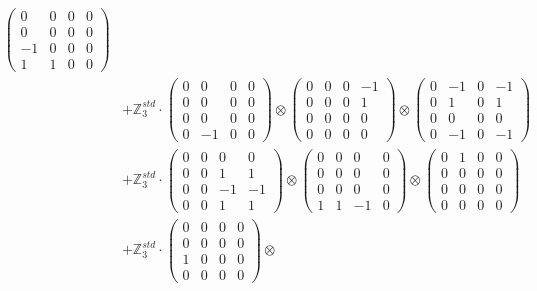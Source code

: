 \documentclass{article}
\begin{document}
{\begin{align}
            \begin{pmatrix} 0 & 0 & 0 & 0 \\ 0 & 0 & 0 & 0 \\ -1 & 0 & 0 & 0 \\ 1 & 1 & 0 & 0 \end{pmatrix} \\ 
        &+ \label{Rs16-Rc11-Solution-29-c25} \mathbb{Z}_3^{std} \cdot 
            \begin{pmatrix} 0 & 0 & 0 & 0 \\ 0 & 0 & 0 & 0 \\ 0 & 0 & 0 & 0 \\ 0 & -1 & 0 & 0 \end{pmatrix} \otimes 
            \begin{pmatrix} 0 & 0 & 0 & -1 \\ 0 & 0 & 0 & 1 \\ 0 & 0 & 0 & 0 \\ 0 & 0 & 0 & 0 \end{pmatrix} \otimes 
            \begin{pmatrix} 0 & -1 & 0 & -1 \\ 0 & 1 & 0 & 1 \\ 0 & 0 & 0 & 0 \\ 0 & -1 & 0 & -1 \end{pmatrix} \\ 
        &+ \label{Rs16-Rc11-Solution-29-c26} \mathbb{Z}_3^{std} \cdot 
            \begin{pmatrix} 0 & 0 & 0 & 0 \\ 0 & 0 & 1 & 1 \\ 0 & 0 & -1 & -1 \\ 0 & 0 & 1 & 1 \end{pmatrix} \otimes 
            \begin{pmatrix} 0 & 0 & 0 & 0 \\ 0 & 0 & 0 & 0 \\ 0 & 0 & 0 & 0 \\ 1 & 1 & -1 & 0 \end{pmatrix} \otimes 
            \begin{pmatrix} 0 & 1 & 0 & 0 \\ 0 & 0 & 0 & 0 \\ 0 & 0 & 0 & 0 \\ 0 & 0 & 0 & 0 \end{pmatrix} \\ 
        &+ \label{Rs16-Rc11-Solution-29-c27} \mathbb{Z}_3^{std} \cdot 
            \begin{pmatrix} 0 & 0 & 0 & 0 \\ 0 & 0 & 0 & 0 \\ 1 & 0 & 0 & 0 \\ 0 & 0 & 0 & 0 \end{pmatrix} \otimes 

\end{align}}
\end{document}
